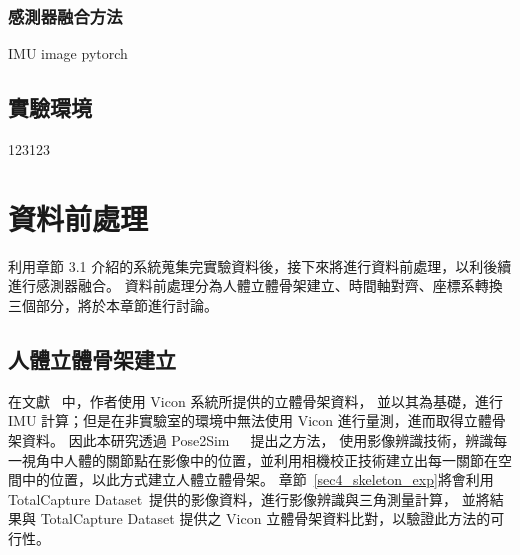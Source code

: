 \subsubsection{感測器融合方法}
IMU image pytorch

\subsection{實驗環境}
123123

\section{資料前處理}
利用章節 3.1 介紹的系統蒐集完實驗資料後，接下來將進行資料前處理，以利後續進行感測器融合。
資料前處理分為人體立體骨架建立、時間軸對齊、座標系轉換三個部分，將於本章節進行討論。

\subsection{人體立體骨架建立}\label{sec3_skeleton_method}
在文獻~\cite{zhang2020fusing} 中，作者使用 Vicon 系統所提供的立體骨架資料，
並以其為基礎，進行 IMU 計算；但是在非實驗室的環境中無法使用 Vicon 進行量測，進而取得立體骨架資料。
因此本研究透過 Pose2Sim~\cite{Pagnon_2021_Robustness}~\cite{Pagnon_2022_Accuracy}~\cite{Pagnon_2022_JOSS}提出之方法，
使用影像辨識技術，辨識每一視角中人體的關節點在影像中的位置，並利用相機校正技術建立出每一關節在空間中的位置，以此方式建立人體立體骨架。
章節~\ref{sec4_skeleton_exp}將會利用 TotalCapture Dataset~\cite{Trumble:BMVC:2017}提供的影像資料，進行影像辨識與三角測量計算，
並將結果與 TotalCapture Dataset 提供之 Vicon 立體骨架資料比對，以驗證此方法的可行性。

